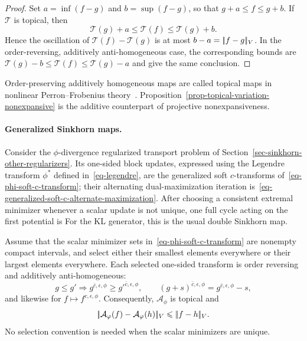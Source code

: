 \begin{proof}
	Set $a=\inf(f-g)$ and $b=\sup(f-g)$, so that $g+a\leq f\leq g+b$. If $\mathcal T$ is topical, then
	\[
		\mathcal T(g)+a\leq\mathcal T(f)\leq\mathcal T(g)+b.
	\]
	Hence the oscillation of $\mathcal T(f)-\mathcal T(g)$ is at most $b-a=|\!| f-g |\!|_V$. In the order-reversing, additively anti-homogeneous case, the corresponding bounds are $\mathcal T(g)-b\leq\mathcal T(f)\leq\mathcal T(g)-a$ and give the same conclusion.
\end{proof}

\begin{rem}\label{rem-topical-maps}
	Order-preserving additively homogeneous maps are called topical maps in nonlinear Perron--Frobenius theory~\cite{lemmens2012nonlinear}. Proposition~\ref{prop-topical-variation-nonexpansive} is the additive counterpart of projective nonexpansiveness.
\end{rem}

\paragraph{Generalized Sinkhorn maps.}
Consider the $\phi$-divergence regularized transport problem of Section~\ref{sec-sinkhorn-other-regularizers}. Its one-sided block updates, expressed using the Legendre transform $\phi^*$ defined in~\eqref{eq-legendre}, are the generalized soft $c$-transforms of~\eqref{eq-phi-soft-c-transform}; their alternating dual-maximization iteration is~\eqref{eq-generalized-soft-c-alternate-maximization}. After choosing a consistent extremal minimizer whenever a scalar update is not unique, one full cycle acting on the first potential is
For the KL generator, this is the usual double Sinkhorn map.

\begin{prop}\label{prop-phi-double-soft-transform-monotone}
	Assume that the scalar minimizer sets in~\eqref{eq-phi-soft-c-transform} are nonempty compact intervals, and select either their smallest elements everywhere or their largest elements everywhere. Each selected one-sided transform is order reversing and additively anti-homogeneous:
	\[
		g\leq g'
		\Longrightarrow
		g^{\bar c,\epsilon,\phi}\geq {g'}^{\bar c,\epsilon,\phi},
		\qquad
		(g+s)^{\bar c,\epsilon,\phi}
		=
		g^{\bar c,\epsilon,\phi}-s,
	\]
	and likewise for $f\mapsto f^{c,\epsilon,\phi}$. Consequently, $\mathcal A_\phi$ is topical and
	\[
		|\!| \mathcal A_\varphi(f)-\mathcal A_\varphi(h) |\!|_V
		\leqslant
		|\!| f-h |\!|_V.
	\]
	No selection convention is needed when the scalar minimizers are unique.
\end{prop}

